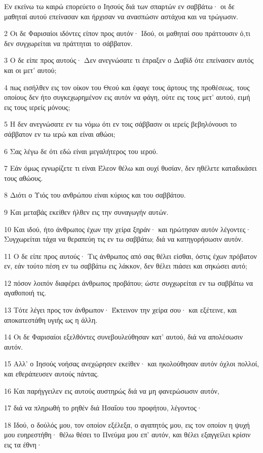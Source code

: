 \par Εν εκείνω τω καιρώ επορεύετο ο Ιησούς διά των σπαρτών εν σαββάτω· οι δε μαθηταί αυτού επείνασαν και ήρχισαν να ανασπώσιν αστάχυα και να τρώγωσιν.
\par 2 Οι δε Φαρισαίοι ιδόντες είπον προς αυτόν· Ιδού, οι μαθηταί σου πράττουσιν ό,τι δεν συγχωρείται να πράττηται το σάββατον.
\par 3 Ο δε είπε προς αυτούς· Δεν ανεγνώσατε τι έπραξεν ο Δαβίδ ότε επείνασεν αυτός και οι μετ' αυτού;
\par 4 πως εισήλθεν εις τον οίκον του Θεού και έφαγε τους άρτους της προθέσεως, τους οποίους δεν ήτο συγκεχωρημένον εις αυτόν να φάγη, ούτε εις τους μετ' αυτού, ειμή εις τους ιερείς μόνους;
\par 5 Η δεν ανεγνώσατε εν τω νόμω ότι εν τοις σάββασιν οι ιερείς βεβηλόνουσι το σάββατον εν τω ιερώ και είναι αθώοι;
\par 6 Σας λέγω δε ότι εδώ είναι μεγαλήτερος του ιερού.
\par 7 Εάν όμως εγνωρίζετε τι είναι Έλεον θέλω και ουχί θυσίαν, δεν ηθέλετε καταδικάσει τους αθώους.
\par 8 Διότι ο Υιός του ανθρώπου είναι κύριος και του σαββάτου.
\par 9 Και μεταβάς εκείθεν ήλθεν εις την συναγωγήν αυτών.
\par 10 Και ιδού, ήτο άνθρωπος έχων την χείρα ξηράν· και ηρώτησαν αυτόν λέγοντες· Συγχωρείται τάχα να θεραπεύη τις εν τω σαββάτω; διά να κατηγορήσωσιν αυτόν.
\par 11 Ο δε είπε προς αυτούς· Τις άνθρωπος από σας θέλει είσθαι, όστις έχων πρόβατον εν, εάν τούτο πέση εν τω σαββάτω εις λάκκον, δεν θέλει πιάσει και σηκώσει αυτό;
\par 12 πόσον λοιπόν διαφέρει άνθρωπος προβάτου; ώστε συγχωρείται εν τω σαββάτω να αγαθοποιή τις.
\par 13 Τότε λέγει προς τον άνθρωπον· Έκτεινον την χείρα σου· και εξέτεινε, και αποκατεστάθη υγιής ως η άλλη.
\par 14 Οι δε Φαρισαίοι εξελθόντες συνεβουλεύθησαν κατ' αυτού, διά να απολέσωσιν αυτόν.
\par 15 Αλλ' ο Ιησούς νοήσας ανεχώρησεν εκείθεν· και ηκολούθησαν αυτόν όχλοι πολλοί, και εθεράπευσεν αυτούς πάντας.
\par 16 Και παρήγγειλεν εις αυτούς αυστηρώς διά να μη φανερώσωσιν αυτόν,
\par 17 διά να πληρωθή το ρηθέν διά Ησαΐου του προφήτου, λέγοντος·
\par 18 Ιδού, ο δούλός μου, τον οποίον εξέλεξα, ο αγαπητός μου, εις τον οποίον η ψυχή μου ευηρεστήθη· θέλω θέσει το Πνεύμα μου επ' αυτόν, και θέλει εξαγγείλει κρίσιν εις τα έθνη·
